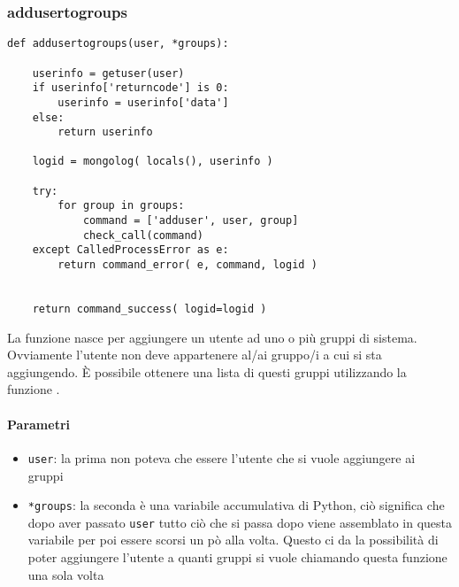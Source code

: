 \documentclass[11pt]{article}
\begin{document}
\subsubsection{addusertogroups}\label{addusertogroups}
\begin{lstlisting}
def addusertogroups(user, *groups):

    userinfo = getuser(user)
    if userinfo['returncode'] is 0:
        userinfo = userinfo['data']
    else:
        return userinfo

    logid = mongolog( locals(), userinfo )
    
    try:
    	for group in groups:
            command = ['adduser', user, group]
            check_call(command)
    except CalledProcessError as e:
        return command_error( e, command, logid )
    
    
    return command_success( logid=logid )
\end{lstlisting}
La funzione nasce per aggiungere un utente ad uno o più gruppi di sistema. Ovviamente l'utente 
non deve appartenere al/ai gruppo/i a cui si sta aggiungendo. È possibile ottenere una lista di questi gruppi
utilizzando la funzione .
\paragraph{Parametri}
\begin{itemize}
	\item{\texttt{user}: la prima non poteva che essere l'utente che si vuole aggiungere ai gruppi}
	\item{\texttt{*groups}: la seconda è una variabile accumulativa di Python, ciò significa che
		dopo aver passato \texttt{user} tutto ciò che si passa dopo viene assemblato in questa variabile
		per poi essere scorsi un pò alla volta. Questo ci da la possibilità di poter
		aggiungere l'utente a quanti gruppi si vuole chiamando questa funzione una sola volta}
\end{itemize}
\end{document}
